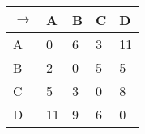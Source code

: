 \begin{minipage}{0.48\textwidth}
    \centering
    \begin{tabular}{|l|l|l|l|l|}
      \hline

      $\rightarrow$ & A  & B & C & D  \\ \hline
      A             & 0  & 6 & 3 & 11 \\ \hline
      B             & 2  & 0 & 5 & 5  \\ \hline
      C             & 5  & 3 & 0 & 8  \\ \hline
      D             & 11 & 9 & 6 & 0  \\ \hline
    \end{tabular}
  \end{minipage}
